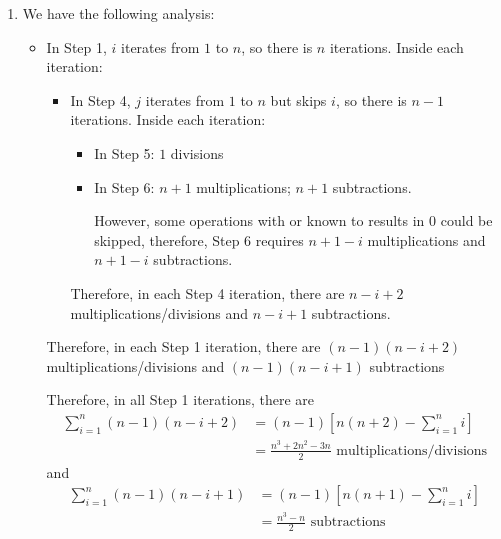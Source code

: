 \documentclass[../../../../Assignments]{subfiles}
\begin{document}
\begin{solution}
    \begin{enumerate}[label = \alph*)]
        \item We have the following analysis:
            \begin{itemize}
                \item In Step 1, \(i\) iterates from \(1\) to \(n\), so there is
                    \(n\) iterations. Inside each iteration:
                    \begin{itemize}
                        \item In Step 4, \(j\) iterates from \(1\) to \(n\) but
                            skips \(i\), so there is \(n - 1\) iterations.
                            Inside each iteration:
                            \begin{itemize}
                                \item In Step 5: \(1\) divisions
                                \item In Step 6: \(n + 1\) multiplications; \(n
                                    + 1\) subtractions.

                                    However, some operations with or known to
                                    results in \(0\) could be skipped,
                                    therefore, Step 6 requires \(n + 1 - i\)
                                    multiplications and \(n + 1 - i\)
                                    subtractions.
                            \end{itemize}

                            Therefore, in each Step 4 iteration, there are \(n - i +
                            2\) multiplications/divisions and \(n - i + 1\)
                            subtractions.
                    \end{itemize}

                    Therefore, in each Step 1 iteration, there are \((n - 1)(n -
                    i + 2)\) multiplications/divisions and \((n - 1)(n - i +
                    1)\) subtractions

                    Therefore, in all Step 1 iterations, there are
                    \begin{align*}
                        \sum_{i = 1}^{n} (n - 1)(n - i + 2) &= (n - 1) \left[n(n + 2) - \sum_{i = 1}^{n} i \right] \\
                                                            &= \frac{n^3 + 2n^2 - 3n}{2} \text{ multiplications/divisions}
                    \end{align*}
                    and
                    \begin{align*}
                        \sum_{i = 1}^{n} (n - 1)(n - i + 1) &= (n - 1) \left[n(n + 1) - \sum_{i = 1}^{n} i \right] \\
                                                            &= \frac{n^3 - n}{2} \text{ subtractions}
                    \end{align*}


\end{itemize}
\end{enumerate}
\end{solution}
\end{document}
